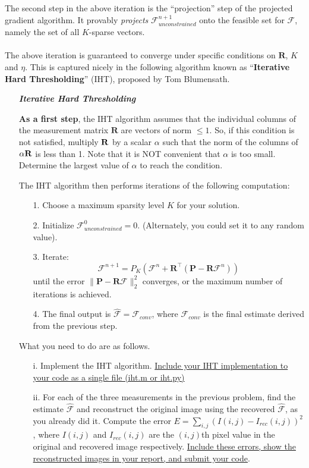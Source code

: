 \\
\\
The second step in the above iteration is the ``projection'' step of the projected gradient algorithm.  It provably \textit{projects} $\mathcal{F}_{unconstrained}^{n+1}$ onto the feasible set for $\mathcal{F}$, namely the set of all $K$-sparse vectors.
\\
\\
The above iteration is guaranteed to converge under specific conditions on $\mathbf{R}$, $K$ and $\eta$. This is captured nicely in the following algorithm known as ``\textbf{Iterative Hard Thresholding}'' (IHT), proposed by Tom Blumensath.

\newpage

\begin{enumerate}
\item [] \textit{\textbf{Iterative Hard Thresholding}}

\textbf{As a first step}, the IHT algorithm assumes that the individual columns of the measurement matrix $\mathbf{R}$ are vectors of norm $\leq 1$. So, if this condition is not satisfied, multiply ${\bf R}$ by a scalar $\alpha$ such that the norm of the columns of $\alpha {\bf R}$ is less than 1. Note that it is NOT convenient that $\alpha$ is too small. Determine the largest value of $\alpha$ to reach the condition.

The IHT algorithm then performs iterations of the following computation:
\begin{enumerate}
\item [1.] Choose a maximum sparsity level $K$ for your solution.
\item [2.] Initialize $\mathcal{F}_{unconstrained}^{0} = 0$. (Alternately, you could set it to any random value).
\item [3.] Iterate:
\[
\mathcal{F}^{n+1} = P_K(\mathcal{F}^n + \mathbf{R}^\top (\mathbf{P} - \mathbf{R}\mathcal{F}^n))
\]
until the error $\|\mathbf{P} - \mathbf{R}\mathcal{F}\|_2^2$ converges, or the maximum number of iterations is achieved.
\item [4.] The final output is $\hat{\mathcal{F}} = \mathcal{F}_{conv}$, where $\mathcal{F}_{conv}$ is the final estimate derived from the previous step.
\end{enumerate}

\item [] What you need to do are as follows.
\begin{enumerate}
\item [i.] Implement the IHT algorithm. \ul{Include your IHT implementation to your code as a single file (iht.m or iht.py)}
\item [ii.] For each of the three measurements in the previous problem, find the estimate $\hat{\mathcal{F}}$ and reconstruct the original image using the recovered $\hat{\mathcal{F}}$, as you already did it. Compute the error $E = \sum_{i,j} (I(i,j) - I_{rec}(i,j))^2$, where $I(i,j)$ and $I_{rec}(i,j)$ are the $(i,j)$th pixel value in the original and recovered image respectively.  \ul{Include these errors, show the reconstructed images in your report, and submit your code}. 


\end{enumerate}
\end{enumerate}
